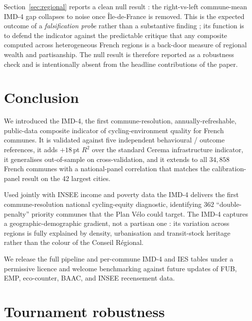 \documentclass[11pt,a4paper]{article}
\begin{document}
Section~\ref{sec:regional} reports a clean null result : the
right-vs-left commune-mean IMD-4 gap collapses to noise once
\^Ile-de-France is removed.  This is the expected outcome of a
\emph{falsification probe} rather than a substantive finding ;
its function is to defend the indicator against the
predictable critique that any composite computed across
heterogeneous French regions is a back-door measure of regional
wealth and partisanship.  The null result is therefore reported
as a robustness check and is intentionally absent from the
headline contributions of the paper.

\section{Conclusion}
\label{sec:conclusion}

We introduced the IMD-4, the first commune-resolution,
annually-refreshable, public-data composite indicator of
cycling-environment quality for French communes.  It is validated against five independent
behavioural / outcome references, it adds $+18\,$pt $R^2$ over
the standard Cerema infrastructure indicator, it generalises
out-of-sample on cross-validation, and it extends to all
$34{,}858$ French communes with a national-panel correlation
that matches the calibration-panel result on the 42 largest
cities.

Used jointly with INSEE income and poverty data the IMD-4
delivers the first commune-resolution national cycling-equity
diagnostic, identifying $362$ ``double-penalty'' priority communes
that the Plan V\'elo could target.  The IMD-4 captures a
geographic-demographic gradient, not a partisan one : its variation
across regions is fully explained by density, urbanisation and
transit-stock heritage rather than the colour of the Conseil
R\'egional.

We release the full pipeline and per-commune IMD-4 and IES
tables under a permissive licence and welcome benchmarking against
future updates of FUB, EMP, eco-counter, BAAC, and INSEE recensement
data.

\appendix

\section{Tournament robustness}
\label{app:robust}
\end{document}
